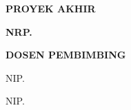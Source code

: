 \newpage
\thispagestyle{empty}

\begin{flushright}
  {\FontJudulDalamLabel\bfseries PROYEK AKHIR\par}
\end{flushright}

\vspace{1.5cm}

\begin{center}

  \begin{minipage}{1\textwidth}
    \centering
    \FontJudulDalamJudul\bfseries\MakeUppercase{\JudulPA}
  \end{minipage}
  \par

  \vspace{1.2cm}

  {\FontJudulDalamIsi\bfseries \NamaMahasiswa\par}
  {\FontJudulDalamIsi\bfseries NRP. \NRP\par}

  \vspace{0.8cm}

  {\FontJudulDalamIsi\bfseries DOSEN PEMBIMBING\par}
  {\FontJudulDalamIsi \NamaPembimbingSatu\par}
  {\FontJudulDalamIsi NIP. \NIPPembimbingSatu\par}
  \vspace{0.5cm}
  {\FontJudulDalamIsi \NamaPembimbingDua\par}
  {\FontJudulDalamIsi NIP. \NIPPembimbingDua\par}



\end{center}
